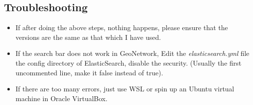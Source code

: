 \documentclass{article}
\begin{document}
        \subsection*{Troubleshooting}
            \begin{itemize}
                \item If after doing the above steps, nothing happens, please ensure that the versions are the same as that which I have used.
                \item If the search bar does not work in GeoNetwork, Edit the \emph{elasticsearch.yml} file the config directory of ElasticSearch, disable the security. (Usually the first uncommented line, make it false instead of true).
                \item If there are too many errors, just use WSL or spin up an Ubuntu virtual machine in Oracle VirtualBox.
            \end{itemize}
\end{document}
